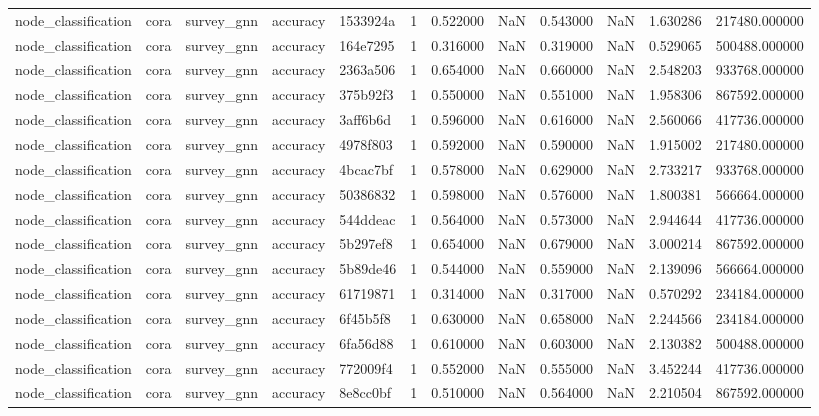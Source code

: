 \begin{tabular}{lllllrrrrrrr}
node_classification & cora & survey_gnn & accuracy & 1533924a & 1 & 0.522000 & NaN & 0.543000 & NaN & 1.630286 & 217480.000000 \\
node_classification & cora & survey_gnn & accuracy & 164e7295 & 1 & 0.316000 & NaN & 0.319000 & NaN & 0.529065 & 500488.000000 \\
node_classification & cora & survey_gnn & accuracy & 2363a506 & 1 & 0.654000 & NaN & 0.660000 & NaN & 2.548203 & 933768.000000 \\
node_classification & cora & survey_gnn & accuracy & 375b92f3 & 1 & 0.550000 & NaN & 0.551000 & NaN & 1.958306 & 867592.000000 \\
node_classification & cora & survey_gnn & accuracy & 3aff6b6d & 1 & 0.596000 & NaN & 0.616000 & NaN & 2.560066 & 417736.000000 \\
node_classification & cora & survey_gnn & accuracy & 4978f803 & 1 & 0.592000 & NaN & 0.590000 & NaN & 1.915002 & 217480.000000 \\
node_classification & cora & survey_gnn & accuracy & 4bcac7bf & 1 & 0.578000 & NaN & 0.629000 & NaN & 2.733217 & 933768.000000 \\
node_classification & cora & survey_gnn & accuracy & 50386832 & 1 & 0.598000 & NaN & 0.576000 & NaN & 1.800381 & 566664.000000 \\
node_classification & cora & survey_gnn & accuracy & 544ddeac & 1 & 0.564000 & NaN & 0.573000 & NaN & 2.944644 & 417736.000000 \\
node_classification & cora & survey_gnn & accuracy & 5b297ef8 & 1 & 0.654000 & NaN & 0.679000 & NaN & 3.000214 & 867592.000000 \\
node_classification & cora & survey_gnn & accuracy & 5b89de46 & 1 & 0.544000 & NaN & 0.559000 & NaN & 2.139096 & 566664.000000 \\
node_classification & cora & survey_gnn & accuracy & 61719871 & 1 & 0.314000 & NaN & 0.317000 & NaN & 0.570292 & 234184.000000 \\
node_classification & cora & survey_gnn & accuracy & 6f45b5f8 & 1 & 0.630000 & NaN & 0.658000 & NaN & 2.244566 & 234184.000000 \\
node_classification & cora & survey_gnn & accuracy & 6fa56d88 & 1 & 0.610000 & NaN & 0.603000 & NaN & 2.130382 & 500488.000000 \\
node_classification & cora & survey_gnn & accuracy & 772009f4 & 1 & 0.552000 & NaN & 0.555000 & NaN & 3.452244 & 417736.000000 \\
node_classification & cora & survey_gnn & accuracy & 8e8cc0bf & 1 & 0.510000 & NaN & 0.564000 & NaN & 2.210504 & 867592.000000 \\

\end{tabular}
